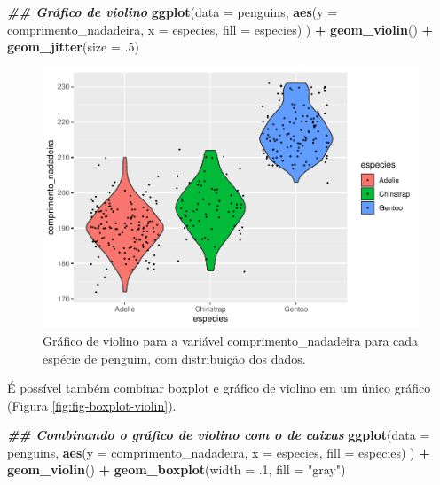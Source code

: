 \documentclass[
]{article}
\newenvironment{Shaded}{\begin{snugshade}}{\end{snugshade}}
\newcommand{\AttributeTok}[1]{\textcolor[rgb]{0.13,0.29,0.53}{#1}}
\newcommand{\DecValTok}[1]{\textcolor[rgb]{0.00,0.00,0.81}{#1}}
\newcommand{\DocumentationTok}[1]{\textcolor[rgb]{0.56,0.35,0.01}{\textbf{\textit{#1}}}}
\newcommand{\FunctionTok}[1]{\textcolor[rgb]{0.13,0.29,0.53}{\textbf{#1}}}
\newcommand{\NormalTok}[1]{#1}
\newcommand{\SpecialCharTok}[1]{\textcolor[rgb]{0.81,0.36,0.00}{\textbf{#1}}}
\newcommand{\StringTok}[1]{\textcolor[rgb]{0.31,0.60,0.02}{#1}}
\begin{document}
\begin{Shaded}
\begin{Highlighting}[]
\DocumentationTok{\#\# Gráfico de violino}
\FunctionTok{ggplot}\NormalTok{(}\AttributeTok{data =}\NormalTok{ penguins, }
       \FunctionTok{aes}\NormalTok{(}\AttributeTok{y =}\NormalTok{ comprimento\_nadadeira, }\AttributeTok{x =}\NormalTok{ especies, }\AttributeTok{fill =}\NormalTok{ especies)}
\NormalTok{       ) }\SpecialCharTok{+}
    \FunctionTok{geom\_violin}\NormalTok{() }\SpecialCharTok{+}
    \FunctionTok{geom\_jitter}\NormalTok{(}\AttributeTok{size =}\NormalTok{ .}\DecValTok{5}\NormalTok{)}
\end{Highlighting}
\end{Shaded}

\begin{figure}
\centering
\includegraphics{epr_files/figure-latex/fig-violin-1.pdf}
\caption{\label{fig:fig-violin}Gráfico de violino para a variável comprimento\_nadadeira para cada espécie de penguim, com distribuição dos dados.}
\end{figure}

É possível também combinar boxplot e gráfico de violino em um único gráfico (Figura \ref{fig:fig-boxplot-violin}).

\begin{Shaded}
\begin{Highlighting}[]
\DocumentationTok{\#\# Combinando o gráfico de violino com o de caixas}
\FunctionTok{ggplot}\NormalTok{(}\AttributeTok{data =}\NormalTok{ penguins, }
       \FunctionTok{aes}\NormalTok{(}\AttributeTok{y =}\NormalTok{ comprimento\_nadadeira, }\AttributeTok{x =}\NormalTok{ especies, }\AttributeTok{fill =}\NormalTok{ especies)}
\NormalTok{       ) }\SpecialCharTok{+}
    \FunctionTok{geom\_violin}\NormalTok{() }\SpecialCharTok{+}
    \FunctionTok{geom\_boxplot}\NormalTok{(}\AttributeTok{width =}\NormalTok{ .}\DecValTok{1}\NormalTok{, }\AttributeTok{fill =} \StringTok{"gray"}\NormalTok{)}
\end{Highlighting}
\end{Shaded}
\end{document}
